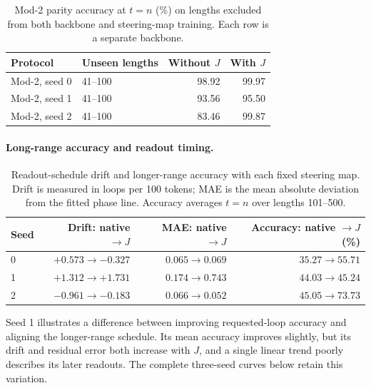 \documentclass{article}
\begin{document}
\begin{table}[!htbp]
\centering
\caption{Mod-2 parity accuracy at $t=n$ (\%) on lengths excluded from both backbone and steering-map training. Each row is a separate backbone.}
\label{tab:parity-uniform}
\begin{tabular}{@{}llrr@{}}
\toprule
Protocol & Unseen lengths & Without $J$ & With $J$ \\
\midrule
Mod-2, seed 0 & 41--100 & 98.92 & 99.97 \\
Mod-2, seed 1 & 41--100 & 93.56 & 95.50 \\
Mod-2, seed 2 & 41--100 & 83.46 & 99.87 \\
\bottomrule\end{tabular}\end{table}

\paragraph{Long-range accuracy and readout timing.}
\begin{table}[!htbp]
\centering
\caption{Readout-schedule drift and longer-range accuracy with each fixed steering map. Drift is measured in loops per 100 tokens; MAE is the mean absolute deviation from the fitted phase line. Accuracy averages $t=n$ over lengths 101--500.}
\begin{tabular}{@{}lrrr@{}}
\toprule
Seed & Drift: native $\to J$ & MAE: native $\to J$ & Accuracy: native $\to J$ (\%) \\
\midrule
0 & $+0.573\to-0.327$ & $0.065\to0.069$ & $35.27\to55.71$ \\
1 & $+1.312\to+1.731$ & $0.174\to0.743$ & $44.03\to45.24$ \\
2 & $-0.961\to-0.183$ & $0.066\to0.052$ & $45.05\to73.73$ \\
\bottomrule
\end{tabular}
\end{table}

Seed 1 illustrates a difference between improving requested-loop accuracy and aligning the longer-range schedule. Its mean accuracy improves slightly, but its drift and residual error both increase with $J$, and a single linear trend poorly describes its later readouts. The complete three-seed curves below retain this variation.
\end{document}
